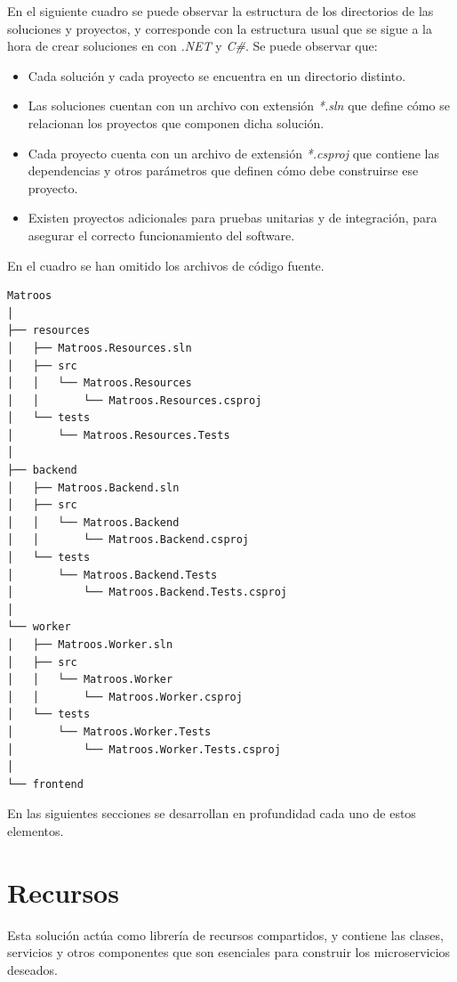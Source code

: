 En el siguiente cuadro se puede observar la estructura de los directorios de las soluciones y proyectos, y corresponde con la estructura usual que se sigue a la hora de crear soluciones en con \textit{.NET} y \textit{C\#}. Se puede observar que:

\begin{itemize}
	\item Cada solución y cada proyecto se encuentra en un directorio distinto.
	\item Las soluciones cuentan con un archivo con extensión \textit{*.sln} que define cómo se relacionan los proyectos que componen dicha solución.
	\item Cada proyecto cuenta con un archivo de extensión \textit{*.csproj} que contiene las dependencias y otros parámetros que definen cómo debe construirse ese proyecto.
	\item Existen proyectos adicionales para pruebas unitarias y de integración, para asegurar el correcto funcionamiento del software.
\end{itemize}

{\scriptsize En el cuadro se han omitido los archivos de código fuente.}

\begin{lstlisting}[style=tree]
Matroos
│
├── resources
│   ├── Matroos.Resources.sln
│   ├── src
│   │   └── Matroos.Resources
│   │       └── Matroos.Resources.csproj
│   └── tests
│       └── Matroos.Resources.Tests
│
├── backend
│   ├── Matroos.Backend.sln
│   ├── src
│   │   └── Matroos.Backend
│   │       └── Matroos.Backend.csproj
│   └── tests
│       └── Matroos.Backend.Tests
│           └── Matroos.Backend.Tests.csproj
│
└── worker
│   ├── Matroos.Worker.sln
│   ├── src
│   │   └── Matroos.Worker
│   │       └── Matroos.Worker.csproj
│   └── tests
│       └── Matroos.Worker.Tests
│           └── Matroos.Worker.Tests.csproj
│
└── frontend
\end{lstlisting}

En las siguientes secciones se desarrollan en profundidad cada uno de estos elementos.









\section{Recursos}

Esta solución actúa como librería de recursos compartidos, y contiene las clases, servicios y otros componentes que son esenciales para construir los microservicios deseados.

